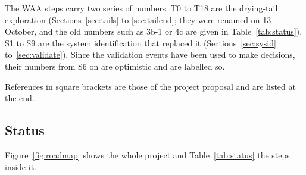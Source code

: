 \documentclass[11pt,a4paper]{article}
\begin{document}
The WAA steps carry two series of numbers. T0 to T18 are the drying-tail exploration (Sections~\ref{sec:tails} to
\ref{sec:tailend}; they were renamed on 13 October, and the old numbers such as 3b-1 or 4c are given in
Table~\ref{tab:status}). S1 to S9 are the system identification that replaced it (Sections~\ref{sec:sysid}
to~\ref{sec:validate}). Since the validation events have been used to make decisions, their numbers from S6 on are
optimistic and are labelled so.

References in square brackets are those of the project proposal and are listed at the end.

\subsection{Status}

Figure~\ref{fig:roadmap} shows the whole project and Table~\ref{tab:status} the steps inside it.
\end{document}
